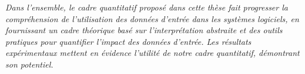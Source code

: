   \emph{Dans l'ensemble, le cadre quantitatif proposé dans cette thèse fait progresser la compréhension de l'utilisation des données d'entrée dans les systèmes logiciels, en fournissant un cadre théorique basé sur l'interprétation abstraite et des outils pratiques pour quantifier l'impact des données d'entrée. Les résultats expérimentaux mettent en évidence l'utilité de notre cadre quantitatif, démontrant son potentiel.}

